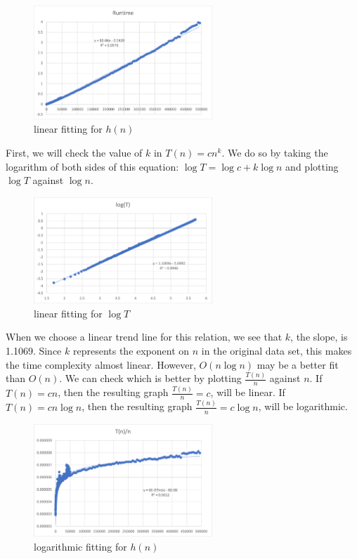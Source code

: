 \documentclass[12pt]{article}
\begin{document}
\begin{figure}[H]
\centering
\includegraphics[width=0.6\textwidth,height=\textheight,keepaspectratio]{hn_Tn}
\caption{linear fitting for $h(n)$}
\label{Figure: hn_1}
\end{figure}

\noindent First, we will check the value of $k$ in $T(n) = cn^k$. We do so by taking the logarithm of both sides of this equation: $\log{T}=\log{c}+k\log{n}$ and plotting $\log{T}$ against $\log{n}$. 

\begin{figure}[H]
\centering
\includegraphics[width=0.6\textwidth,height=\textheight,keepaspectratio]{hn_logT}
\caption{linear fitting for $\log{T}$}
\label{Figure: hn_2}
\end{figure}

\noindent When we choose a linear trend line for this relation, we see that $k$, the slope, is 1.1069. Since $k$ represents the exponent on $n$ in the original data set, this makes the time complexity almost linear. However, $O(n\log{n})$ may be a better fit than $O(n)$. We can check which is better by plotting $\frac{T(n)}{n}$ against $n$. If $T(n) = cn$, then the resulting graph $\frac{T(n)}{n} = c$, will be linear. If $T(n) = cn\log{n}$, then the resulting graph $\frac{T(n)}{n} = c\log{n}$, will be logarithmic.

\begin{figure}[H]
\centering
\includegraphics[width=0.6\textwidth,height=\textheight,keepaspectratio]{hn_Tn_n}
\caption{logarithmic fitting for $h(n)$}
\label{Figure: hn_3}
\end{figure}
\end{document}
